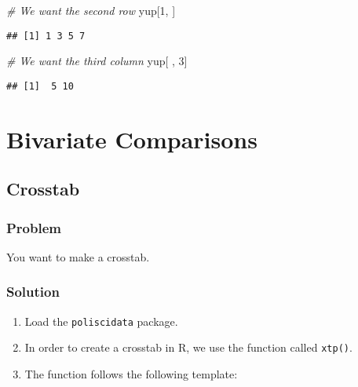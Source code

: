 \documentclass[]{book}
\newenvironment{Shaded}{\begin{snugshade}}{\end{snugshade}}
\newcommand{\DecValTok}[1]{\textcolor[rgb]{0.00,0.00,0.81}{{#1}}}
\newcommand{\CommentTok}[1]{\textcolor[rgb]{0.56,0.35,0.01}{\textit{{#1}}}}
\newcommand{\NormalTok}[1]{{#1}}
\providecommand{\tightlist}{%
  \setlength{\itemsep}{0pt}\setlength{\parskip}{0pt}}
\begin{document}
\begin{Shaded}
\begin{Highlighting}[]
\CommentTok{# We want the second row}
\NormalTok{yup[}\DecValTok{1}\NormalTok{, ]}
\end{Highlighting}
\end{Shaded}

\begin{verbatim}
## [1] 1 3 5 7
\end{verbatim}

\begin{Shaded}
\begin{Highlighting}[]
\CommentTok{# We want the third column}
\NormalTok{yup[ , }\DecValTok{3}\NormalTok{]}
\end{Highlighting}
\end{Shaded}

\begin{verbatim}
## [1]  5 10
\end{verbatim}

\chapter{Bivariate Comparisons}\label{bivariate-comparisons}

\section{Crosstab}\label{crosstab}

\subsection{Problem}\label{problem-5}

You want to make a crosstab.

\subsection{Solution}\label{solution-5}

\begin{enumerate}
\def\labelenumi{\arabic{enumi}.}
\tightlist
\item
  Load the \texttt{poliscidata} package.
\item
  In order to create a crosstab in R, we use the function called
  \texttt{xtp()}.\\
\item
  The function follows the following template:
\end{enumerate}
\end{document}
